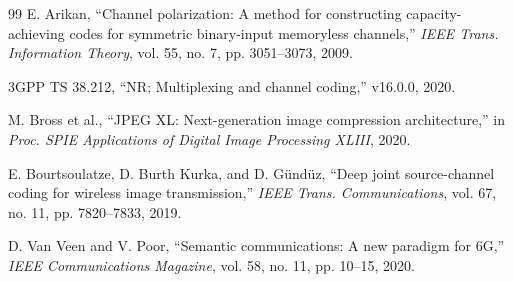 \documentclass[12pt, a4paper]{article}
\begin{document}
\begin{thebibliography}{99}
E. Arikan, ``Channel polarization: A method for constructing capacity-achieving codes for symmetric binary-input memoryless channels,'' \textit{IEEE Trans. Information Theory}, vol. 55, no. 7, pp. 3051--3073, 2009.

3GPP TS 38.212, ``NR; Multiplexing and channel coding,'' v16.0.0, 2020.

M. Bross et al., ``JPEG XL: Next-generation image compression architecture,'' in \textit{Proc. SPIE Applications of Digital Image Processing XLIII}, 2020.

E. Bourtsoulatze, D. Burth Kurka, and D. G\"und\"uz, ``Deep joint source-channel coding for wireless image transmission,'' \textit{IEEE Trans. Communications}, vol. 67, no. 11, pp. 7820--7833, 2019.

D. Van Veen and V. Poor, ``Semantic communications: A new paradigm for 6G,'' \textit{IEEE Communications Magazine}, vol. 58, no. 11, pp. 10--15, 2020.

\end{thebibliography}
\end{document}
